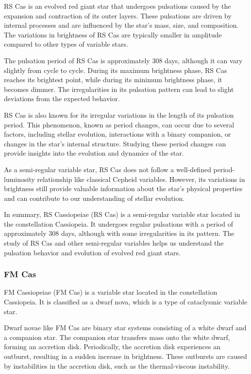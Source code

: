 RS Cas is an evolved red giant star that undergoes pulsations caused by the expansion and contraction of its outer layers. These pulsations are driven by internal processes and are influenced by the star's mass, size, and composition. The variations in brightness of RS Cas are typically smaller in amplitude compared to other types of variable stars.

The pulsation period of RS Cas is approximately 308 days, although it can vary slightly from cycle to cycle. During its maximum brightness phase, RS Cas reaches its brightest point, while during its minimum brightness phase, it becomes dimmer. The irregularities in its pulsation pattern can lead to slight deviations from the expected behavior.

RS Cas is also known for its irregular variations in the length of its pulsation period. This phenomenon, known as period changes, can occur due to several factors, including stellar evolution, interactions with a binary companion, or changes in the star's internal structure. Studying these period changes can provide insights into the evolution and dynamics of the star.

As a semi-regular variable star, RS Cas does not follow a well-defined period-luminosity relationship like classical Cepheid variables. However, its variations in brightness still provide valuable information about the star's physical properties and can contribute to our understanding of stellar evolution.

In summary, RS Cassiopeiae (RS Cas) is a semi-regular variable star located in the constellation Cassiopeia. It undergoes regular pulsations with a period of approximately 308 days, although with some irregularities in its pattern. The study of RS Cas and other semi-regular variables helps us understand the pulsation behavior and evolution of evolved red giant stars.


\subsubsection*{ FM Cas }
FM Cassiopeiae (FM Cas) is a variable star located in the constellation Cassiopeia. It is classified as a dwarf nova, which is a type of cataclysmic variable star.

Dwarf novae like FM Cas are binary star systems consisting of a white dwarf and a companion star. The companion star transfers mass onto the white dwarf, forming an accretion disk. Periodically, the accretion disk experiences an outburst, resulting in a sudden increase in brightness. These outbursts are caused by instabilities in the accretion disk, such as the thermal-viscous instability.

